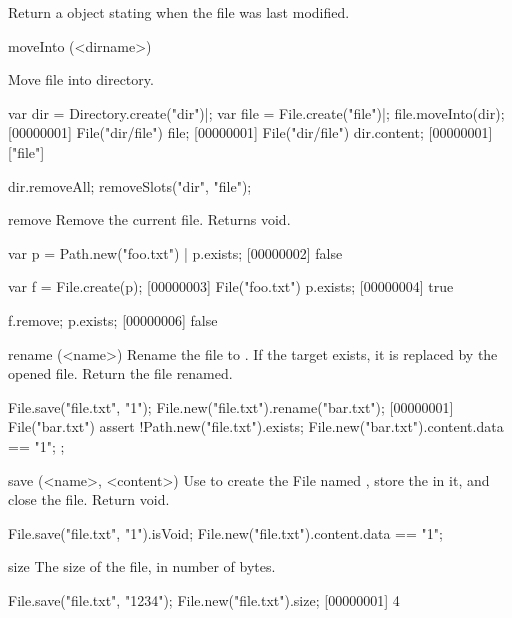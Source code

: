 \begin{urbiscriptapi}
  Return a  object stating when the file was last modified.


\item[moveInto](<dirname>)
  \experimental{}

  Move file into  directory.
\begin{urbiscript}
var dir = Directory.create("dir")|;
var file = File.create("file")|;
file.moveInto(dir);
[00000001] File("dir/file")
file;
[00000001] File("dir/file")
dir.content;
[00000001] ["file"]
\end{urbiscript}
\begin{urbicomment}
dir.removeAll;
removeSlots("dir", "file");
\end{urbicomment}

\item[remove]
  Remove the current file.  Returns void.
\begin{urbiscript}[firstnumber=1]
var p = Path.new("foo.txt") |
p.exists;
[00000002] false

var f = File.create(p);
[00000003] File("foo.txt")
p.exists;
[00000004] true

f.remove;
p.exists;
[00000006] false
\end{urbiscript}


\item[rename](<name>)%
  Rename the file to .  If the target exists, it is replaced by
  the opened file. Return the file renamed.
\begin{urbiscript}
File.save("file.txt", "1\n");
File.new("file.txt").rename("bar.txt");
[00000001] File("bar.txt")
assert
{
  !Path.new("file.txt").exists;
  File.new("bar.txt").content.data == "1\n";
};
\end{urbiscript}


\item[save](<name>, <content>)
  Use  to create the File named , store the
   in it, and close the file.  Return void.
\begin{urbiassert}
File.save("file.txt", "1\n").isVoid;
File.new("file.txt").content.data == "1\n";
\end{urbiassert}


\item[size]
  The size of the file, in number of bytes.
\begin{urbiscript}
File.save("file.txt", "1234");
File.new("file.txt").size;
[00000001] 4
\end{urbiscript}
\end{urbiscriptapi}



